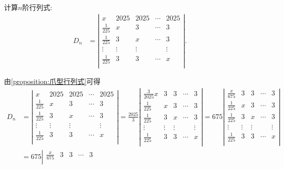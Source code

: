 \documentclass[../../main.tex]{subfiles}%
\begin{document}
\begin{example}
计算$n$阶行列式:
\begin{align*}
D_n&=\left| \begin{matrix}
x&		2025&		2025&		\cdots&		2025\\
\frac{1}{225}&		x&		3&		\cdots&		3\\
\frac{1}{225}&		3&		x&		\cdots&		3\\
\vdots&		\vdots&		\vdots&		&		\vdots\\
\frac{1}{225}&		3&		3&		\cdots&		x\\
\end{matrix} \right|.
\end{align*}
\end{example}
\begin{solution}
由\cref{proposition:爪型行列式}可得
\begin{align*}
D_n&=\left| \begin{matrix}
x&		2025&		2025&		\cdots&		2025\\
\frac{1}{225}&		x&		3&		\cdots&		3\\
\frac{1}{225}&		3&		x&		\cdots&		3\\
\vdots&		\vdots&		\vdots&		&		\vdots\\
\frac{1}{225}&		3&		3&		\cdots&		x\\
\end{matrix} \right|=\frac{2025}{3}\left| \begin{matrix}
\frac{3}{2025}x&		3&		3&		\cdots&		3\\
\frac{1}{225}&		x&		3&		\cdots&		3\\
\frac{1}{225}&		3&		x&		\cdots&		3\\
\vdots&		\vdots&		\vdots&		&		\vdots\\
\frac{1}{225}&		3&		3&		\cdots&		x\\
\end{matrix} \right|=675\left| \begin{matrix}
\frac{x}{675}&		3&		3&		\cdots&		3\\
\frac{1}{225}&		x&		3&		\cdots&		3\\
\frac{1}{225}&		3&		x&		\cdots&		3\\
\vdots&		\vdots&		\vdots&		&		\vdots\\
\frac{1}{225}&		3&		3&		\cdots&		x\\
\end{matrix} \right|
\\
&=675\left| \begin{matrix}
\frac{x}{675}&		3&		3&		\cdots&		3\\

\end{matrix}
\end{align*}
\end{solution}
\end{document}
